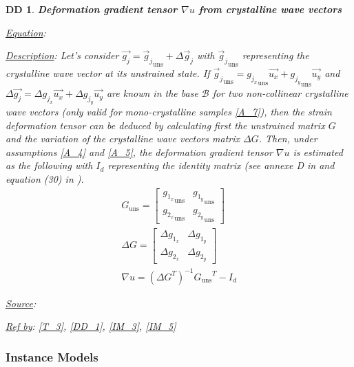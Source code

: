 \documentclass[12pt]{article}
\newtheorem{DD}{DD}
\begin{document}
\begin{DD}
\label{DD_3}
\noindent\colorbox{shadecolorDD}{\normalfont \textbf{Deformation gradient tensor $\nabla u$ from crystalline wave vectors}}
\normalfont
\item \underline{Equation}: 
\item \underline{Description}: Let's consider $\overrightarrow{g_j} = {\overrightarrow{g}_{j}}_{\text{uns}} + \Delta \overrightarrow{g}_j$ with ${\overrightarrow{g}_{j}}_{\text{uns}}$ representing the crystalline wave vector at its unstrained state. If ${\overrightarrow{g}_{j}}_{\text{uns}}={g_{j_{x}}}_{\text{uns}}\overrightarrow{u_{x}}+{g_{j_{y}}}_{\text{uns}}\overrightarrow{u_{y}}$ and $\Delta \overrightarrow{g_{j}}=\Delta g_{j_{x}}\overrightarrow{u_{x}}+\Delta g_{j_{y}}\overrightarrow{u_{y}}$ are known in the base $\mathcal{B}$ for two non-collinear crystalline wave vectors (only valid for mono-crystalline samples \cref{A_7}), then the strain deformation tensor can be deduced by calculating first the unstrained matrix $G$ and the variation of the crystalline wave vectors matrix $\Delta G$. Then, under assumptions \cref{A_4} and \cref{A_5}, the deformation gradient tensor $\nabla u$ is estimated as the following with $I_{d}$ representing the identity matrix (see annexe D in \cite{Hytch1998} and equation (30) in \cite{Rouviere2005}). 
\begin{equation}
\begin{gathered}
	G_{\text{uns}} =
	\begin{bmatrix}
	{g_{1_{x}}}_{\text{uns}} & {g_{1_{y}}}_{\text{uns}} \\
	{g_{2_{x}}}_{\text{uns}} & {g_{2_{y}}}_{\text{uns}} 
	\end{bmatrix} \\
	\Delta G =
	\begin{bmatrix}
	\Delta g_{1_{x}} & \Delta g_{1_{y}} \\
	\Delta g_{2_{x}} & \Delta g_{2_{y}} 
	\end{bmatrix} \\
	\nabla u = ({\Delta G}^{T})^{-1}{G_{\text{uns}}}^{T}-I_{d}
\end{gathered}
\label{eq:strain_1}
\end{equation}
\item \underline{Source}: \cite{Hytch1998,Rouviere2005}
\item \underline{Ref by}: \cref{T_3}, \cref{DD_1}, \cref{IM_3}, \cref{IM_5}
\end{DD}

\subsubsection{Instance Models} \label{sec_instance}    
\end{document}
